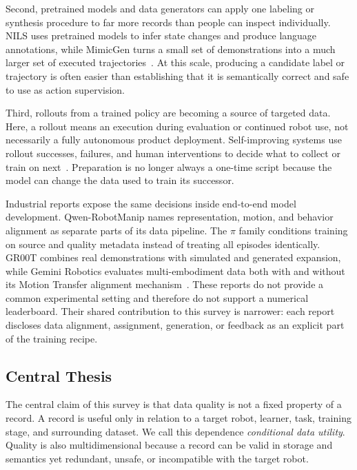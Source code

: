 Second, pretrained models and data generators can apply one labeling or synthesis procedure to far more records than people can inspect individually.
NILS uses pretrained models to infer state changes and produce language annotations, while MimicGen turns a small set of demonstrations into a much larger set of executed trajectories~\cite{blank2024scaling_2410_17772,mandlekar2023mimicgen_2310_17596}.
At this scale, producing a candidate label or trajectory is often easier than establishing that it is semantically correct and safe to use as action supervision.

Third, rollouts from a trained policy are becoming a source of targeted data.
Here, a rollout means an execution during evaluation or continued robot use, not necessarily a fully autonomous product deployment.
Self-improving systems use rollout successes, failures, and human interventions to decide what to collect or train on next~\cite{bousmalis2023robocat_2306_11706,ahn2024autort_2401_12963,intelligence20250_2511_14759,pan2026sop_2601_03044,wang2026learning_2605_00416}.
Preparation is no longer always a one-time script because the model can change the data used to train its successor.

Industrial reports expose the same decisions inside end-to-end model development.
Qwen-RobotManip names representation, motion, and behavior alignment as separate parts of its data pipeline.
The $\pi$ family conditions training on source and quality metadata instead of treating all episodes identically.
GR00T combines real demonstrations with simulated and generated expansion, while Gemini Robotics evaluates multi-embodiment data both with and without its Motion Transfer alignment mechanism~\cite{yuan2026qwen_2606_17846,intelligence20260_2604_15483,nvidia2025gr00t_2503_14734,team2025gemini_2510_03342}.
These reports do not provide a common experimental setting and therefore do not support a numerical leaderboard.
Their shared contribution to this survey is narrower: each report discloses data alignment, assignment, generation, or feedback as an explicit part of the training recipe.



\subsection{Central Thesis}

The central claim of this survey is that data quality is not a fixed property of a record.
A record is useful only in relation to a target robot, learner, task, training stage, and surrounding dataset.
We call this dependence \emph{conditional data utility}.
Quality is also multidimensional because a record can be valid in storage and semantics yet redundant, unsafe, or incompatible with the target robot.

